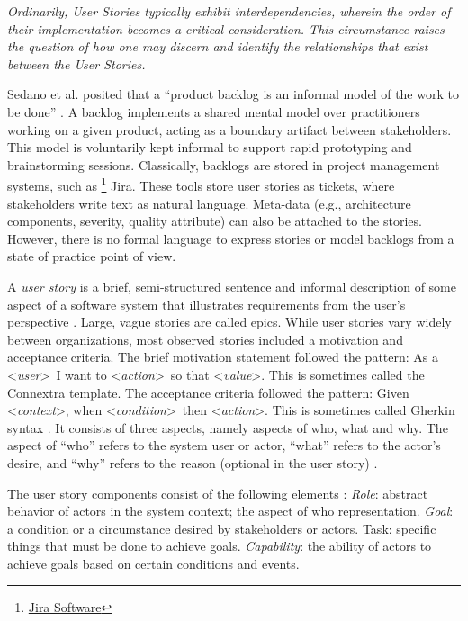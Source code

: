 \emph{Ordinarily, User Stories typically exhibit interdependencies, wherein the order of their implementation becomes a critical consideration. This circumstance raises the question of how one may discern and identify the relationships that exist between the User Stories.}

Sedano et al. posited that a \enquote{product backlog is an informal model of the work to be done} \cite{sedano2019product}. A backlog implements a shared mental model over practitioners working on a given product, acting as a boundary artifact between stakeholders. This model is voluntarily kept informal to support rapid prototyping and brainstorming sessions. Classically, backlogs are stored in project management systems, such as \footnote{\href{https://www.atlassian.com/en/software/jira}{Jira Software}} Jira. These tools store user stories as tickets, where stakeholders write text as natural language. Meta-data (e.g., architecture components, severity, quality attribute) can also be attached to the stories. However, there is no formal language to express stories or model backlogs from a state of practice point of view.

A \emph{user story} is a brief, semi-structured sentence and informal description of some aspect of a software system that illustrates requirements from the user’s perspective \cite{raharjana2021user}. Large, vague stories are called epics. While user stories vary widely between organizations, most observed stories included a motivation and acceptance criteria. The brief motivation statement followed the pattern:  As a  \textless\emph{user}\textgreater\ I want to \textless\emph{action}\textgreater\ so that \textless\emph{value}\textgreater. This is sometimes called the Connextra template. The acceptance criteria followed the pattern: Given \textless\emph{context}\textgreater, when \textless\emph{condition}\textgreater \  then \textless\emph{action}\textgreater. This is sometimes called Gherkin syntax \cite{wynne2017cucumber}. It consists of three aspects, namely aspects of who, what and why. The aspect of \enquote{who} refers to the system user or actor, \enquote{what} refers to the actor’s desire, and \enquote{why} refers to the reason (optional in the user story) \cite{raharjana2021user}.

The user story components consist of the following elements \cite{wautelet2017user} : \emph{Role}: abstract behavior of actors in the system context; the aspect of who representation. \emph{Goal}: a condition or a circumstance desired by stakeholders or actors. Task: specific things that must be done to achieve goals. \emph{Capability}: the ability of actors to achieve goals based on certain conditions and events.

